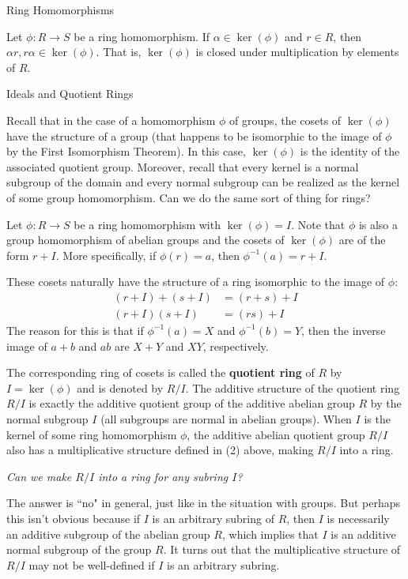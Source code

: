 \begin{section}{Ring Homomorphisms}
\begin{theorem}
Let $\phi:R\to S$ be a ring homomorphism.  If $\alpha\in\ker(\phi)$ and $r\in R$, then $\alpha r, r\alpha\in \ker(\phi)$.  That is, $\ker(\phi)$ is closed under multiplication by elements of $R$.
\end{theorem}

\end{section}

\begin{section}{Ideals and Quotient Rings}

Recall that in the case of a homomorphism $\phi$ of groups, the cosets of $\ker(\phi)$ have the structure of a group (that happens to be isomorphic to the image of $\phi$ by the First Isomorphism Theorem).  In this case, $\ker(\phi)$ is the identity of the associated quotient group.  Moreover, recall that every kernel is a normal subgroup of the domain and every normal subgroup can be realized as the kernel of some group homomorphism.  Can we do the same sort of thing for rings?

Let $\phi:R\to S$ be a ring homomorphism with $\ker(\phi)=I$.  Note that $\phi$ is also a group homomorphism of abelian groups and the cosets of $\ker(\phi)$ are of the form $r+I$.  More specifically, if $\phi(r)=a$, then $\phi^{-1}(a)=r+I$.

These cosets naturally have the structure of a ring isomorphic to the image of $\phi$:
\begin{align}
(r+I)+(s+I) & =  (r+s)+I\\
(r+I)(s+I) & = (rs)+I
\end{align}
The reason for this is that if $\phi^{-1}(a)=X$ and $\phi^{-1}(b)=Y$, then the inverse image of $a+b$ and $ab$ are $X+Y$ and $XY$, respectively.

The corresponding ring of cosets is called the \textbf{quotient ring} of $R$ by $I=\ker(\phi)$ and is denoted by $R/I$.  The additive structure of the quotient ring $R/I$ is exactly the additive quotient group of the additive abelian group $R$ by the normal subgroup $I$ (all subgroups are normal in abelian groups).  When $I$ is the kernel of some ring homomorphism $\phi$, the additive abelian quotient group $R/I$ also has a multiplicative structure defined in (2) above, making $R/I$ into a ring.

\begin{center}
\emph{Can we make $R/I$ into a ring for any subring $I$?}
\end{center}

The answer is ``no" in general, just like in the situation with groups.  But perhaps this isn't obvious because if $I$ is an arbitrary subring of $R$, then $I$ is necessarily an additive subgroup of the abelian group $R$, which implies that $I$ is an additive normal subgroup of the group $R$.  It turns out that the multiplicative structure of $R/I$ may not be well-defined if $I$ is an arbitrary subring.


\end{section}

